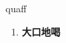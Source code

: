 
\begin{frame}
{\huge quaff}
\begin{center}
\begin{enumerate}\Large
  \item \textbf{大口地喝}
\end{enumerate}
\end{center}
\end{frame}
